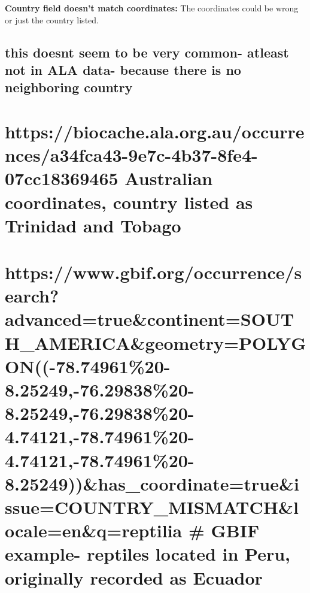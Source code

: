 \documentclass[
  letterpaper,
  DIV=11,
  numbers=noendperiod,
  oneside]{scrreprt}
\begin{document}
\textbf{Country field doesn't match coordinates:} The coordinates could
be wrong or just the country listed.

\hypertarget{this-doesnt-seem-to-be-very-common--atleast-not-in-ala-data--because-there-is-no-neighboring-country}{%
\section{this doesnt seem to be very common- atleast not in ALA data-
because there is no neighboring
country}\label{this-doesnt-seem-to-be-very-common--atleast-not-in-ala-data--because-there-is-no-neighboring-country}}


\hypertarget{httpsbiocache.ala.org.auoccurrencesa34fca43-9e7c-4b37-8fe4-07cc18369465-australian-coordinates-country-listed-as-trinidad-and-tobago}{%
\chapter{https://biocache.ala.org.au/occurrences/a34fca43-9e7c-4b37-8fe4-07cc18369465
Australian coordinates, country listed as Trinidad and
Tobago}\label{httpsbiocache.ala.org.auoccurrencesa34fca43-9e7c-4b37-8fe4-07cc18369465-australian-coordinates-country-listed-as-trinidad-and-tobago}}


\hypertarget{httpswww.gbif.orgoccurrencesearchadvancedtruecontinentsouth_americageometrypolygon-78.7496120-8.25249-76.2983820-8.25249-76.2983820-4.74121-78.7496120-4.74121-78.7496120-8.25249has_coordinatetrueissuecountry_mismatchlocaleenqreptilia-gbif-example--reptiles-located-in-peru-originally-recorded-as-ecuador}{%
\chapter{https://www.gbif.org/occurrence/search?advanced=true\&continent=SOUTH\_AMERICA\&geometry=POLYGON((-78.74961\%20-8.25249,-76.29838\%20-8.25249,-76.29838\%20-4.74121,-78.74961\%20-4.74121,-78.74961\%20-8.25249))\&has\_coordinate=true\&issue=COUNTRY\_MISMATCH\&locale=en\&q=reptilia
\# GBIF example- reptiles located in Peru, originally recorded as
Ecuador}\label{httpswww.gbif.orgoccurrencesearchadvancedtruecontinentsouth_americageometrypolygon-78.7496120-8.25249-76.2983820-8.25249-76.2983820-4.74121-78.7496120-4.74121-78.7496120-8.25249has_coordinatetrueissuecountry_mismatchlocaleenqreptilia-gbif-example--reptiles-located-in-peru-originally-recorded-as-ecuador}}
\end{document}
